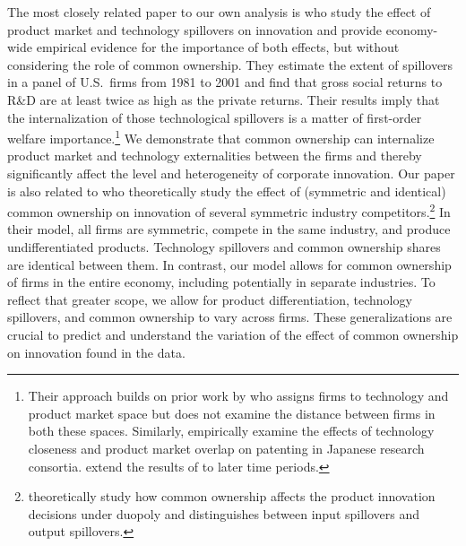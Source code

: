 \documentclass[12pt]{article}
\begin{document}
The most closely related paper to our own analysis is \cite{bloom2013} who study the effect of product market and technology spillovers on innovation and provide economy-wide empirical evidence for the importance of both effects, but without considering the role of common ownership. They estimate the extent of spillovers in a panel of U.S.~firms from 1981 to 2001 and find that gross social returns to R\&D are at least twice as high as the private returns. Their results imply that the internalization of those technological spillovers is a matter of first-order welfare importance.\footnote{Their approach builds on prior work by \citet{jaffe1988} who assigns firms to technology and product market space but does not examine the distance between firms in both these spaces. Similarly, \citet{branstetter2002} empirically examine the effects of technology closeness and product market overlap on patenting in Japanese research consortia. \citet{lucking2018spillovers} extend the results of \cite{bloom2013} to later time periods.} We demonstrate that common ownership can internalize product market and technology externalities between the firms and thereby significantly affect the level and heterogeneity of corporate innovation. Our paper is also related to \cite{lopez2016cross} who theoretically study the effect of (symmetric and identical) common ownership on innovation of several symmetric industry competitors.\footnote{\cite{stenbacka2020overlapping} theoretically study how common ownership affects the product innovation decisions under duopoly and distinguishes between input spillovers and output spillovers.} In their model, all firms are symmetric, compete in the same industry, and produce undifferentiated products. Technology spillovers and common ownership shares are identical between them. In contrast, our model allows for common ownership of firms in the entire economy, including potentially in separate industries. To reflect that greater scope, we allow for product differentiation, technology spillovers, and common ownership to vary across firms. These generalizations are crucial to predict and understand the variation of the effect of common ownership on innovation found in the data. %
%
\end{document}
